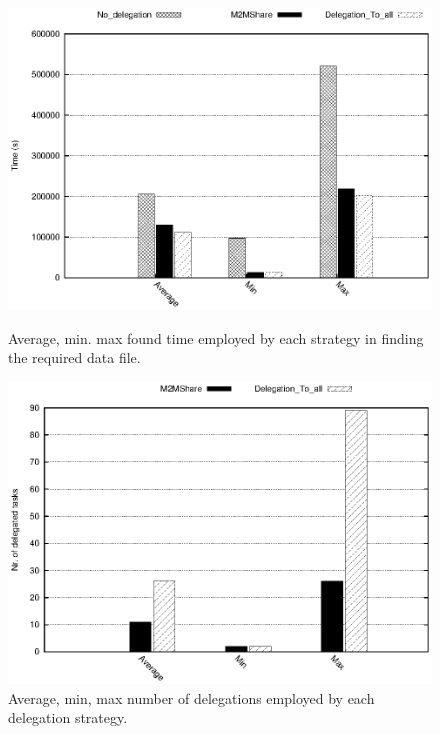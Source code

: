 \begin{figure}[ht]
\begin{minipage}[b]{0.48\linewidth}
\centering
\includegraphics[scale=0.48]{grafici/tempi.eps}
\caption{Average, min. max found time employed by each strategy in finding the required data file.}
\label{graficoTempiVF}
\end{minipage}
\hspace{0.5cm}
\begin{minipage}[b]{0.48\linewidth}
\centering
\includegraphics[scale=0.48]{grafici/delegheFatte.eps}
\caption{Average, min, max number of delegations employed by each delegation strategy.}
\label{graficoNumeroDeleghe}
\end{minipage}
\end{figure}


